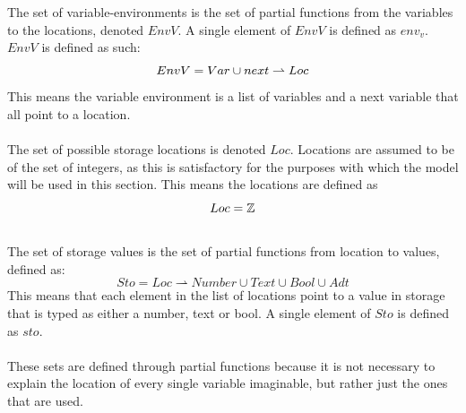\noindent
The set of variable-environments is the set of partial functions from the variables to the locations, denoted $EnvV$. 
A single element of $EnvV$ is defined as $env_v$. $EnvV$ is defined as such:
\begin{equation*}
\centering
    EnvV = Var \cup next \rightharpoonup Loc
\end{equation*}
This means the variable environment is a list of variables and a next variable that all point to a location.
\\\\
 The set of possible storage locations is denoted $Loc$. Locations are assumed to be of the set of integers, as this is satisfactory for the purposes with which the model will be used in this section. This means the locations are defined as \\ 
\begin{equation*}
\centering
    Loc = \mathbb{Z}
\end{equation*}
\\
The set of storage values is the set of partial functions from location to values, defined as:
\begin{equation*}
Sto = Loc \rightharpoonup Number \cup Text \cup Bool \cup Adt
\end{equation*}
This means that each element in the list of locations point to a value in storage that is typed as either a number, text or bool. 
A single element of $Sto$ is defined as $sto$. 
\\\\
These sets are defined through partial functions because it is not necessary to explain the location of every single variable imaginable, but rather just the ones that are used.

